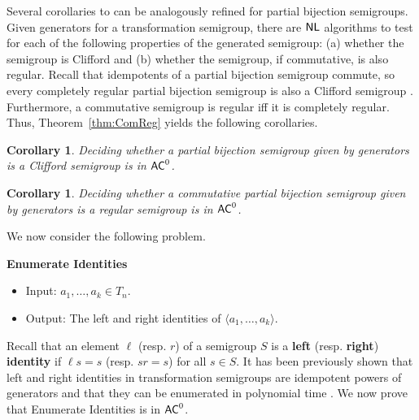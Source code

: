 \documentclass{amsart}
\newcommand{\NL}{\ensuremath\mathsf{NL}}
\newcommand{\AC}{\ensuremath\mathsf{AC}}
\newtheorem{corollary}[theorem]{Corollary}
\theoremstyle{remark}
\numberwithin{equation}{section}
\begin{document}
Several corollaries to \cite[Thm 5.6]{FJ:CP} can be analogously refined for partial bijection semigroups. Given generators for a transformation semigroup, there are $\NL$ algorithms to test for each of the following properties of the generated semigroup: (a) whether the semigroup is Clifford and (b) whether the semigroup, if commutative, is also regular. Recall that  idempotents of a partial bijection semigroup commute, so every completely regular partial bijection semigroup is also a Clifford semigroup \cite[Def 4.2.1]{HO:FST}. Furthermore, a commutative semigroup is regular iff it is completely regular. Thus, Theorem~\ref{thm:ComReg} yields the following corollaries.

\begin{corollary} \label{cor:Cliff}
Deciding whether a partial bijection semigroup given by generators is a Clifford semigroup is in $\AC^0$.
\end{corollary}

\begin{corollary} \label{cor:Reg}
Deciding whether a commutative partial bijection semigroup given by generators is a regular semigroup is in $\AC^0$.
\end{corollary}

We now consider the following problem.

\medskip
{\bf Enumerate Identities}
\begin{itemize}
\item Input: $a_1,\dots,a_k \in T_n$.
\item Output: The left and right identities of $\langle a_1, \dots, a_k\rangle$.
\end{itemize}

Recall that an element $\ell$ (resp. $r$) of a semigroup $S$ is a {\bf left} (resp. {\bf right}) {\bf identity} if $\ell s = s$ (resp. $sr = s$) for all $s \in S$. It has been previously shown that left and right identities in transformation semigroups are idempotent powers of generators \cite[Lem 6.1 and Lem 6.3]{FJ:CP} and that they can be enumerated in polynomial time \cite[Thm 6.2 and Thm 6.4]{FJ:CP}. We now prove that Enumerate Identities is in $\AC^0$.
\end{document}
